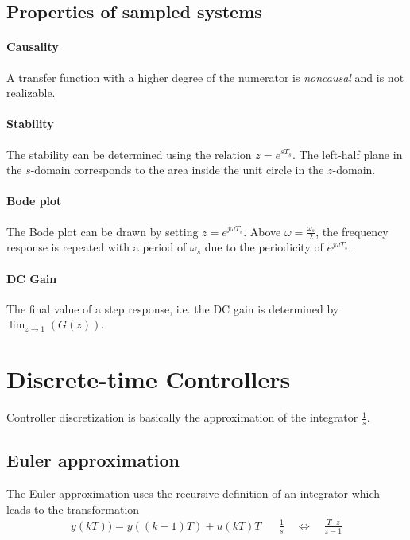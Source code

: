 \subsection{Properties of sampled systems}

\paragraph{Causality}A transfer function with a higher degree of the numerator is \emph{noncausal}
and is not realizable.

\paragraph{Stability}The stability can be determined using the relation $z = e^{sT_s}$.
The left-half plane in the $s$-domain corresponds to the area inside the unit circle in the $z$-domain.

\paragraph{Bode plot}The Bode plot can be drawn by setting $z = e^{j \omega T_s}$.
Above $\omega = \frac{\omega_s}{2}$, the frequency response is repeated with a period of $\omega_s$
due to the periodicity of $e^{j \omega T_s}$.

\paragraph{DC Gain}The final value of a step response, i.e. the DC gain is determined by
$\lim_{z \to 1}(G(z))$.

\section{Discrete-time Controllers}
Controller discretization is basically the approximation of the integrator $\frac{1}{s}$.

\subsection{Euler approximation}
The Euler approximation uses the recursive definition of an integrator which leads to the transformation
\begin{align*}
    y(kT)) = y((k-1)T) + u(kT) T &&
    \frac{1}{s} \quad \Leftrightarrow \quad \frac{T \cdot z}{z-1}
\end{align*}

